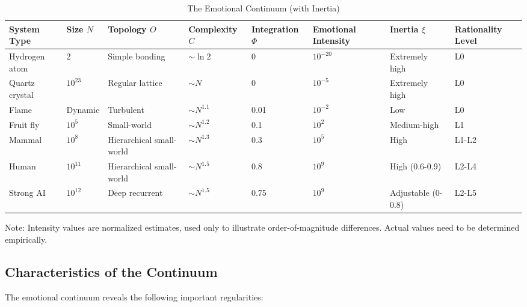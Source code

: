 \documentclass[12pt,a4paper]{article}
\theoremstyle{plain}
\begin{document}
\begin{table}[h]
\centering
\caption{The Emotional Continuum (with Inertia)}
\label{tab:spectrum}
\begin{tabular}{llllllll}
\toprule
\textbf{System Type} & \textbf{Size $N$} & \textbf{Topology $O$} & \textbf{Complexity $C$} & \textbf{Integration $\Phi$} & \textbf{Emotional Intensity} & \textbf{Inertia $\xi$} & \textbf{Rationality Level} \\
\midrule
Hydrogen atom & 2 & Simple bonding & $\sim\ln 2$ & 0 & $10^{-20}$ & Extremely high & L0 \\
Quartz crystal & $10^{23}$ & Regular lattice & $\sim N$ & 0 & $10^{-5}$ & Extremely high & L0 \\
Flame & Dynamic & Turbulent & $\sim N^{1.1}$ & 0.01 & $10^{-2}$ & Low & L0 \\
Fruit fly & $10^5$ & Small-world & $\sim N^{1.2}$ & 0.1 & $10^2$ & Medium-high & L1 \\
Mammal & $10^8$ & Hierarchical small-world & $\sim N^{1.3}$ & 0.3 & $10^5$ & High & L1-L2 \\
Human & $10^{11}$ & Hierarchical small-world & $\sim N^{1.5}$ & 0.8 & $10^9$ & High (0.6-0.9) & L2-L4 \\
Strong AI & $10^{12}$ & Deep recurrent & $\sim N^{1.5}$ & 0.75 & $10^9$ & Adjustable (0-0.8) & L2-L5 \\
\bottomrule
\end{tabular}
\end{table}

Note: Intensity values are normalized estimates, used only to illustrate order-of-magnitude differences. Actual values need to be determined empirically.

\subsection{Characteristics of the Continuum}

The emotional continuum reveals the following important regularities:
\end{document}
